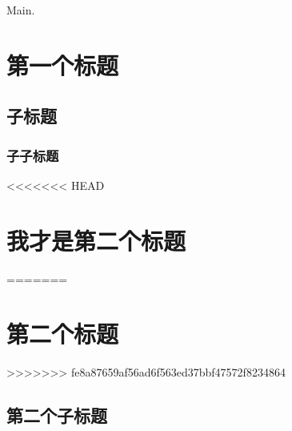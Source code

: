 \documentclass{article}
\begin{document}
Main.

\section{第一个标题}

\subsection{子标题}

\subsubsection{子子标题}

<<<<<<< HEAD
\section{我才是第二个标题}
=======
\section{第二个标题}
>>>>>>> fe8a87659af56ad6f563ed37bbf47572f8234864

\subsection{第二个子标题}
\end{document}
